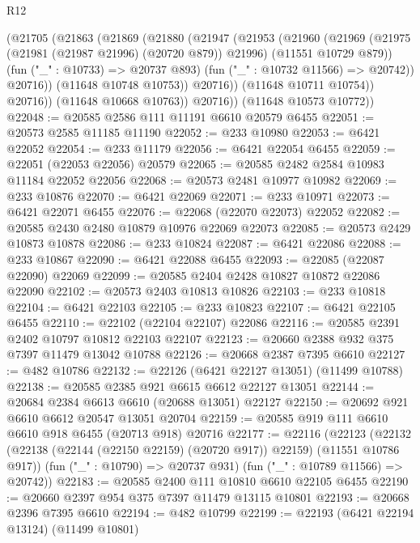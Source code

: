 \begin{lexlean}{R12}
\begin{coremodule}
{{{{{{{{{{{{{{{{{{{{{{{{{{{{{{{{{{{{{{{{{{{{{{{{{{{{{{{{{{{{{{{{{{{{{{{{{{{{{{{{{{                (@21705
                  (@21863
                    (@21869
                      (@21880
                        (@21947
                          (@21953
                            (@21960
                              (@21969
                                (@21975 (@21981 (@21987 @21996) (@20720 @879)) @21996)
                                (@11551 @10729 @879))
                              (fun ("_" : @10733) => @20737 @893)
                              (fun ("_" : @10732 @11566) => @20742))
                            @20716))
                        (@11648 @10748 @10753))
                      @20716))
                  (@11648 @10711 @10754))
                @20716))
            (@11648 @10668 @10763))
          @20716))
      (@11648 @10573 @10772))
@22048 := @20585 @2586 @111 @11191 @6610 @20579 @6455
@22051 := @20573 @2585 @11185 @11190
@22052 := @233 @10980
@22053 := @6421 @22052
@22054 := @233 @11179
@22056 := @6421 @22054 @6455
@22059 := @22051 (@22053 @22056) @20579
@22065 := @20585 @2482 @2584 @10983 @11184 @22052 @22056
@22068 := @20573 @2481 @10977 @10982
@22069 := @233 @10876
@22070 := @6421 @22069
@22071 := @233 @10971
@22073 := @6421 @22071 @6455
@22076 := @22068 (@22070 @22073) @22052
@22082 := @20585 @2430 @2480 @10879 @10976 @22069 @22073
@22085 := @20573 @2429 @10873 @10878
@22086 := @233 @10824
@22087 := @6421 @22086
@22088 := @233 @10867
@22090 := @6421 @22088 @6455
@22093 := @22085 (@22087 @22090) @22069
@22099 := @20585 @2404 @2428 @10827 @10872 @22086 @22090
@22102 := @20573 @2403 @10813 @10826
@22103 := @233 @10818
@22104 := @6421 @22103
@22105 := @233 @10823
@22107 := @6421 @22105 @6455
@22110 := @22102 (@22104 @22107) @22086
@22116 := @20585 @2391 @2402 @10797 @10812 @22103 @22107
@22123 := @20660 @2388 @932 @375 @7397 @11479 @13042 @10788
@22126 := @20668 @2387 @7395 @6610
@22127 := @482 @10786
@22132 := @22126 (@6421 @22127 @13051) (@11499 @10788)
@22138 := @20585 @2385 @921 @6615 @6612 @22127 @13051
@22144 := @20684 @2384 @6613 @6610 (@20688 @13051) @22127
@22150 := @20692 @921 @6610 @6612 @20547 @13051 @20704
@22159 := @20585 @919 @111 @6610 @6610 @918 @6455 (@20713 @918) @20716
@22177 := @22116
    (@22123
      (@22132 (@22138 (@22144 (@22150 @22159) (@20720 @917)) @22159) (@11551 @10786 @917))
      (fun ("_" : @10790) => @20737 @931)
      (fun ("_" : @10789 @11566) => @20742))
@22183 := @20585 @2400 @111 @10810 @6610 @22105 @6455
@22190 := @20660 @2397 @954 @375 @7397 @11479 @13115 @10801
@22193 := @20668 @2396 @7395 @6610
@22194 := @482 @10799
@22199 := @22193 (@6421 @22194 @13124) (@11499 @10801)
}}}}}}}}}}}}}}}}}}}}}}}}}}}}}}}}}}}}}}}}}}}}}}}}}}}}}}}}}}}}}}}}}}}}}}}}}}}}}}}}}}
\end{coremodule}
\end{lexlean}
